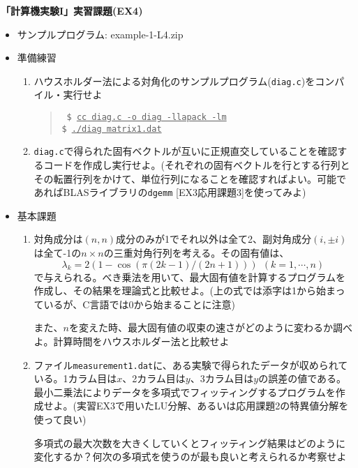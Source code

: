 \documentclass[11pt]{jarticle}
\begin{document}
\noindent
{\bf\large 「計算機実験I」実習課題(EX4)}
\\[-0.5em]

\noindent
\begin{itemize}

\item サンプルプログラム: example-1-L4.zip
  
\item 準備練習
  \begin{enumerate}
  \item ハウスホルダー法による対角化のサンプルプログラム({\tt diag.c})をコンパイル・実行せよ
    \begin{quote} \tt
      \$ \underline{cc diag.c -o diag -llapack -lm} \\
      \$ \underline{./diag matrix1.dat}
    \end{quote}
  \item {\tt diag.c}で得られた固有ベクトルが互いに正規直交していることを確認するコードを作成し実行せよ。(それぞれの固有ベクトルを行とする行列とその転置行列をかけて、単位行列になることを確認すればよい。可能であればBLASライブラリの{\tt dgemm} [EX3応用課題3]を使ってみよ)
  \end{enumerate}

\item 基本課題
  \begin{enumerate}
  \item 対角成分は$(n,n)$成分のみが1でそれ以外は全て2、副対角成分$(i,\pm i)$は全て-1の$n \times n$の三重対角行列を考える。その固有値は、
    \[ \lambda_k = 2 (1 - \cos (\pi (2 k - 1) / (2 n + 1))) \ \ (k=1,\cdots,n)\]
    で与えられる。べき乗法を用いて、最大固有値を計算するプログラムを作成し、その結果を理論式と比較せよ。(上の式では添字は1から始まっているが、C言語では0から始まることに注意)

    また、$n$を変えた時、最大固有値の収束の速さがどのように変わるか調べよ。計算時間をハウスホルダー法と比較せよ
  \item ファイル{\tt measurement1.dat}に、ある実験で得られたデータが収められている。1カラム目は$x$、2カラム目は$y$、3カラム目は$y$の誤差の値である。最小二乗法によりデータを多項式でフィッティングするプログラムを作成せよ。(実習EX3で用いたLU分解、あるいは応用課題2の特異値分解を使って良い)

    多項式の最大次数を大きくしていくとフィッティング結果はどのように変化するか？何次の多項式を使うのが最も良いと考えられるか考察せよ


\end{enumerate}
\end{itemize}
\end{document}
